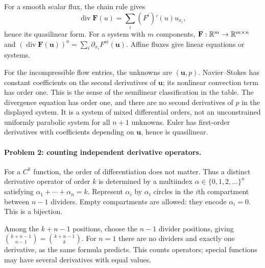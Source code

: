 For a smooth scalar flux, the chain rule gives
\[
 \operatorname{div}\mathbf F(u)=\sum_i(F^i)'(u)u_{x_i},
\]
hence its quasilinear form. For a system with $m$ components,
$\mathbf F:\mathbb{R}^m\to\mathbb{R}^{m\times n}$ and
$(\operatorname{div}\mathbf F(\mathbf u))^a
=\sum_i\partial_{x_i}F^{ai}(\mathbf u)$.
Affine fluxes give linear equations or systems.

For the incompressible flow entries, the unknowns are $(\mathbf u,p)$.
Navier--Stokes has constant coefficients on the second derivatives of
$\mathbf u$; its nonlinear convection term has order one. This is the
sense of the semilinear classification in the table. The divergence equation
has order one, and there are no second derivatives of $p$ in the displayed
system. It is a system of mixed differential orders, not an unconstrained
uniformly parabolic system for all $n+1$ unknowns. Euler has first-order
derivatives with coefficients depending on $\mathbf u$, hence is quasilinear.

\paragraph{Problem 2: counting independent derivative operators.}
\begin{expandedproof}
For a $C^k$ function, the order of differentiation does not matter. Thus a
distinct derivative operator of order $k$ is determined by a multiindex
$\alpha\in\{0,1,2,\ldots\}^n$ satisfying
$\alpha_1+\cdots+\alpha_n=k$. Represent $\alpha_i$ by $\alpha_i$ circles
in the $i$th compartment between $n-1$ dividers. Empty compartments are
allowed: they encode $\alpha_i=0$. This is a bijection.

Among the $k+n-1$ positions, choose the $n-1$ divider positions, giving
$\binom{k+n-1}{n-1}=\binom{k+n-1}{k}$. For $n=1$ there are no dividers
and exactly one derivative, as the same formula predicts. This counts
operators; special functions may have several derivatives with equal values.
\end{expandedproof}

